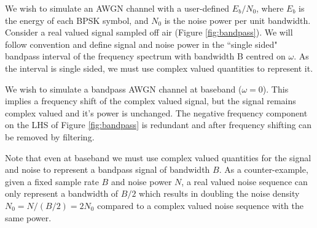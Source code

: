 \documentclass{article}
\begin{document}
We wish to simulate an AWGN channel with a user-defined $E_b/N_0$, where $E_b$ is the energy of each BPSK symbol, and $N_0$ is the noise power per unit bandwidth.  Consider a real valued signal sampled off air (Figure \ref{fig:bandpass}).  We will follow convention and define signal and noise power in the ``single sided" bandpass interval of the frequency spectrum with bandwidth B centred on $\omega$.  As the interval is single sided, we must use complex valued quantities to represent it.

We wish to simulate a bandpass AWGN channel at baseband ($\omega=0$).  This implies a frequency shift of the complex valued signal, but the signal remains complex valued and it's power is unchanged. The negative frequency component on the LHS of Figure \ref{fig:bandpass} is redundant and after frequency shifting can be removed by filtering.

Note that even at baseband we must use complex valued quantities for the signal and noise to represent a bandpass signal of bandwidth $B$.  As a counter-example, given a fixed sample rate $B$ and noise power $N$, a real valued noise sequence can only represent a bandwidth of $B/2$ which results in doubling the noise density $N_0=N/(B/2)=2N_0$ compared to a complex valued noise sequence with the same power.   
\end{document}
